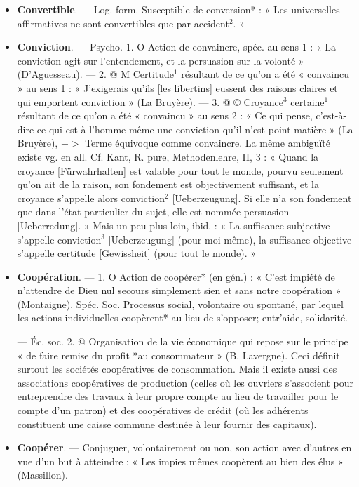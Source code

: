 \begin{itemize}[leftmargin=1cm, label=, itemsep=11pt]
\item {\bf Convertible}. — Log. form. Susceptible de conversion* : « Les universelles
affirmatives ne sont convertibles que par accident$^2$. »

\item {\bf Conviction}. — Psycho. 1. O Action de
convaincre, spéc. au sens 1 : « La
conviction agit sur l’entendement,
et la persuasion sur la volonté »
(D’Aguesseau). — 2. @ M Certitude$^1$
résultant de ce qu’on a été « convaincu » au sens 1 : « J’exigerais
qu'ils [les libertins] eussent des raisons claires et qui emportent conviction » (La Bruyère). — 3. @ ©
Croyance$^3$ certaine$^1$ résultant de ce
qu’on a été « convaincu » au sens 2 :
« Ce qui pense, c’est-à-dire ce qui
est à l’homme même une conviction
qu’il n’est point matière » (La
Bruyère), $->$ Terme équivoque
comme convaincre. La même ambiguïté existe vg. en all. Cf. Kant,
R. pure, Methodenlehre, II, 3 :
« Quand la croyance [Fürwahrhalten] est valable pour tout le monde,
pourvu seulement qu’on ait de la
raison, son fondement est objectivement suffisant, et la croyance
s’appelle alors conviction$^2$ [Ueberzeugung]. Si elle n’a son fondement
que dans l’état particulier du sujet,
elle est nommée persuasion [Ueberredung]. » Mais un peu plus loin, ibid. :
« La suffisance subjective s'appelle
conviction$^3$ [Ueberzeugung] (pour
moi-même), la suffisance objective
s’appelle certitude [Gewissheit] (pour
tout le monde). »

\item {\bf Coopération}. — 1. O Action de coopérer* (en gén.) : « C’est impiété de
n'attendre de Dieu nul secours simplement sien et sans notre coopération » (Montaigne). Spéc. Soc. Processus social, volontaire ou spontané, par lequel les actions individuelles coopèrent* au lieu de s’opposer; entr’aide, solidarité.

— Éc. soc. 2. @ Organisation de
la vie économique qui repose sur le
principe « de faire remise du profit
*au consommateur » (B. Lavergne).
Ceci définit surtout les sociétés
coopératives de consommation. Mais
il existe aussi des associations coopératives de production (celles où les
ouvriers s'associent pour entreprendre des travaux à leur propre
compte au lieu de travailler pour le
compte d'un patron) et des coopératives de crédit (où les adhérents
constituent une caisse commune
destinée à leur fournir des capitaux).

\item {\bf Coopérer}. — Conjuguer, volontairement ou non, son action avec d’autres en vue d'un but à atteindre :
« Les impies mêmes coopèrent au
bien des élus » (Massillon).


\end{itemize}
